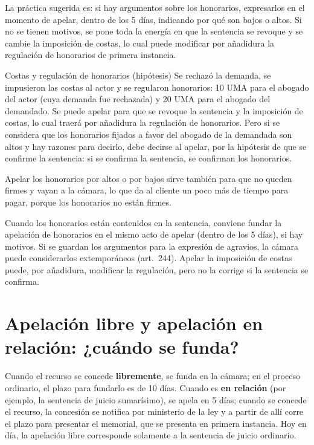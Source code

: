 \documentclass[12pt,oneside]{book}
\begin{document}
La práctica sugerida es: si hay argumentos sobre los honorarios, expresarlos en el momento de apelar, dentro de los 5 días, indicando por qué son bajos o altos. Si no se tienen motivos, se pone toda la energía en que la sentencia se revoque y se cambie la imposición de costas, lo cual puede modificar por añadidura la regulación de honorarios de primera instancia.

\begin{example}{Costas y regulación de honorarios (hipótesis)}
Se rechazó la demanda, se impusieron las costas al actor y se regularon honorarios: 10 UMA para el abogado del actor (cuya demanda fue rechazada) y 20 UMA para el abogado del demandado. Se puede apelar para que se revoque la sentencia y la imposición de costas, lo cual traerá por añadidura la regulación de honorarios. Pero si se considera que los honorarios fijados a favor del abogado de la demandada son altos y hay razones para decirlo, debe decirse al apelar, por la hipótesis de que se confirme la sentencia: si se confirma la sentencia, se confirman los honorarios.
\end{example}

Apelar los honorarios por altos o por bajos sirve también para que no queden firmes y vayan a la cámara, lo que da al cliente un poco más de tiempo para pagar, porque los honorarios no están firmes.

\begin{important}
Cuando los honorarios están contenidos en la sentencia, conviene fundar la apelación de honorarios en el mismo acto de apelar (dentro de los 5 días), si hay motivos. Si se guardan los argumentos para la expresión de agravios, la cámara puede considerarlos extemporáneos (art.~244). Apelar la imposición de costas puede, por añadidura, modificar la regulación, pero no la corrige si la sentencia se confirma.
\end{important}

\section{Apelación libre y apelación en relación: ¿cuándo se funda?}

Cuando el recurso se concede \textbf{libremente}, se funda en la cámara; en el proceso ordinario, el plazo para fundarlo es de 10 días. Cuando es \textbf{en relación} (por ejemplo, la sentencia de juicio sumarísimo), se apela en 5 días; cuando se concede el recurso, la concesión se notifica por ministerio de la ley y a partir de allí corre el plazo para presentar el memorial, que se presenta en primera instancia. Hoy en día, la apelación libre corresponde solamente a la sentencia de juicio ordinario.
\end{document}
